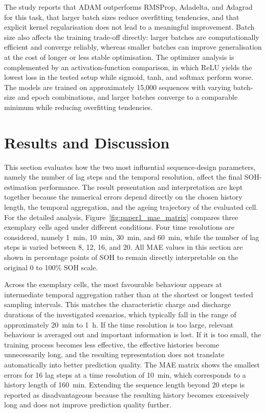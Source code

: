 \documentclass[
    a4paper,
    12pt,
    titlepage,
    bibliography=totoc,
    twoside=on,
    parskip=false,
    numbers=noenddot,
    cleardoublepage=empty,
    DIV=12,
    BCOR=12.0mm,
    headheight=36pt,
    headings=openright
]{scrreprt}
\begin{document}
The study reports that ADAM outperforms RMSProp, Adadelta, and Adagrad for this task, that larger batch sizes reduce overfitting tendencies, and that explicit kernel regularisation does not lead to a meaningful improvement. Batch size also affects the training trade-off directly: larger batches are computationally efficient and converge reliably, whereas smaller batches can improve generalisation at the cost of longer or less stable optimisation. The optimizer analysis is complemented by an activation-function comparison, in which ReLU yields the lowest loss in the tested setup while sigmoid, tanh, and softmax perform worse. The models are trained on approximately 15{,}000 sequences with varying batch-size and epoch combinations, and larger batches converge to a comparable minimum while reducing overfitting tendencies.

\section{Results and Discussion}
This section evaluates how the two most influential sequence-design parameters, namely the number of lag steps and the temporal resolution, affect the final SOH-estimation performance. The result presentation and interpretation are kept together because the numerical errors depend directly on the chosen history length, the temporal aggregation, and the ageing trajectory of the evaluated cell. For the detailed analysis, Figure~\ref{fig:paper1_mae_matrix} compares three exemplary cells aged under different conditions. Four time resolutions are considered, namely \SI{1}{\minute}, \SI{10}{\minute}, \SI{30}{\minute}, and \SI{60}{\minute}, while the number of lag steps is varied between 8, 12, 16, and 20. All MAE values in this section are shown in percentage points of SOH to remain directly interpretable on the original 0 to 100\% SOH scale.

Across the exemplary cells, the most favourable behaviour appears at intermediate temporal aggregation rather than at the shortest or longest tested sampling intervals. This matches the characteristic charge and discharge durations of the investigated scenarios, which typically fall in the range of approximately \SI{20}{\minute} to \SI{1}{\hour}. If the time resolution is too large, relevant behaviour is averaged out and important information is lost. If it is too small, the training process becomes less effective, the effective histories become unnecessarily long, and the resulting representation does not translate automatically into better prediction quality. The MAE matrix shows the smallest errors for 16 lag steps at a time resolution of \SI{10}{\minute}, which corresponds to a history length of \SI{160}{\minute}. Extending the sequence length beyond 20 steps is reported as disadvantageous because the resulting history becomes excessively long and does not improve prediction quality further.
\end{document}
